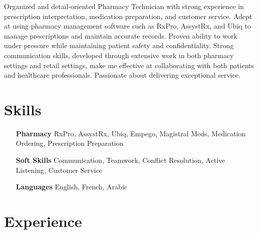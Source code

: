 \documentclass[letterpaper,10pt]{article}
\begin{document}


	Organized and detail-oriented Pharmacy Technician with strong experience in prescription interpretation, medication preparation, and customer service. Adept at using pharmacy management software such as RxPro, AssystRx, and Ubiq to manage prescriptions and maintain accurate records. Proven ability to work under pressure while maintaining patient safety and confidentiality. Strong communication skills, developed through extensive work in both pharmacy settings and retail settings, make me effective at collaborating with both patients and healthcare professionals. Passionate about delivering exceptional service.


  \section{Skills}

  \begin{multicols}{2}
    \begin{itemize}[itemsep=-2px, parsep=5pt, leftmargin=75pt]
      \item[\textbf{Pharmacy}]  RxPro, AssystRx, Ubiq, Empego, Magistral Meds, Medication Ordering, Prescription Preparation
      \item[\textbf{Soft Skills}]  Communication, Teamwork, Conflict Resolution, Active Listening, Customer Service
      \item[\textbf{Languages}]  English, French, Arabic
    \end{itemize}
  \end{multicols}


  \section{Experience}
\end{document}
